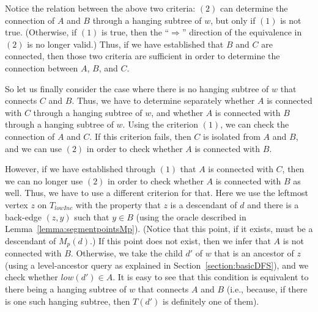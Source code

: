 \documentclass[11pt,a4paper]{article}
\begin{document}
Notice the relation between the above two criteria: $(2)$ can determine the connection of $A$ and $B$ through a hanging subtree of $w$, but only if $(1)$ is not true. (Otherwise, if $(1)$ is true, then the ``$\Rightarrow$'' direction of the equivalence in $(2)$ is no longer valid.) Thus, if we have established that $B$ and $C$ are connected, then those two criteria are sufficient in order to determine the connection between $A$, $B$, and $C$.

So let us finally consider the case where there is no hanging subtree of $w$ that connects $C$ and $B$. Thus, we have to determine separately whether $A$ is connected with $C$ through a hanging subtree of $w$, and whether $A$ is connected with $B$ through a hanging subtree of $w$. Using the criterion $(1)$, we can check the connection of $A$ and $C$. If this criterion fails, then $C$ is isolated from $A$ and $B$, and we can use $(2)$ in order to check whether $A$ is connected with $B$. 

However, if we have established through $(1)$ that $A$ is connected with $C$, then we can no longer use $(2)$ in order to check whether $A$ is connected with $B$ as well. Thus, we have to use a different criterion for that. Here we use the leftmost vertex $z$ on $T_\mathit{lowInc}$ with the property that $z$ is a descendant of $d$ and there is a back-edge $(z,y)$ such that $y\in B$ (using the oracle described in Lemma~\ref{lemma:segmentpointsMp}). (Notice that this point, if it exists, must be a descendant of $M_p(d)$.) If this point does not exist, then we infer that $A$ is not connected with $B$. Otherwise, we take the child $d'$ of $w$ that is an ancestor of $z$ (using a level-ancestor query as explained in Section~\ref{section:basicDFS}), and we check whether $\mathit{low}(d')\in A$. It is easy to see that this condition is equivalent to there being a hanging subtree of $w$ that connects $A$ and $B$ (i.e., because, if there is one such hanging subtree, then $T(d')$ is definitely one of them). 
\end{document}
